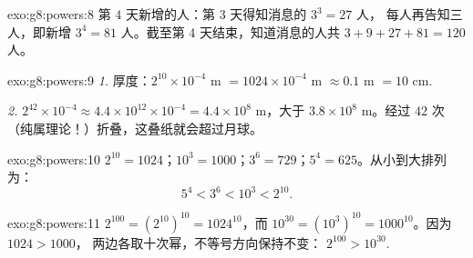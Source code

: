 \begin{solution}{exo:g8:powers:8}
第 $4$ 天新增的人：第 3 天得知消息的 $3^3 = 27$ 人，
每人再告知三人，即新增 $3^4 = 81$ 人。截至第 4 天结束，知道消息的人共
$3 + 9 + 27 + 81 = 120$ 人。
\end{solution}

\begin{solution}{exo:g8:powers:9}
\emph{1.} 厚度：$2^{10} \times 10^{-4}$ m
$= 1024 \times 10^{-4}$ m $\approx 0.1$ m $= 10$ cm.

\emph{2.} $2^{42} \times 10^{-4} \approx 4.4 \times 10^{12} \times
10^{-4} = 4.4 \times 10^8$ m，大于 $3.8 \times 10^8$ m。经过
$42$ 次（纯属理论！）折叠，这叠纸就会超过月球。
\end{solution}

\begin{solution}{exo:g8:powers:10}
$2^{10} = 1024$；$10^3 = 1000$；$3^6 = 729$；$5^4 = 625$。从小到大排列为：
\[
5^4 < 3^6 < 10^3 < 2^{10} .
\]
\end{solution}

\begin{solution}{exo:g8:powers:11}
$2^{100} = \left(2^{10}\right)^{10} = 1024^{10}$，而
$10^{30} = \left(10^3\right)^{10} = 1000^{10}$。因为 $1024 > 1000$，
两边各取十次幂，不等号方向保持不变：
$2^{100} > 10^{30}$.
\end{solution}

